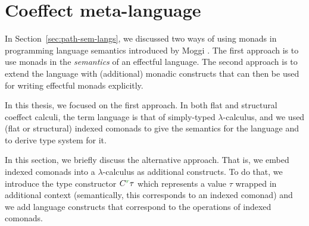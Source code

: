 %                                                                                             

\section{Coeffect meta-language}
\label{sec:unified-meta} 

In Section~\ref{sec:path-sem-langs}, we discussed two ways of using monads in programming
language semantics introduced by Moggi \cite{monad-notions}. The first approach is to use
monads in the \emph{semantics} of an effectful language. The second approach is to extend the
language with (additional) monadic constructs that can then be used for writing effectful
monads explicitly.

In this thesis, we focused on the first approach. In both flat and structural coeffect calculi,
the term language is that of simply-typed $\lambda$-calculus, and we used (flat or structural)
indexed comonads to give the semantics for the language and to derive type system for it.

In this section, we briefly discuss the alternative approach. That is, we embed indexed
comonads into a $\lambda$-calculus as additional constructs. To do that, we introduce the
type constructor $\ctyp{\cclrd{r}}{\tau}$ which represents a value $\tau$ wrapped in additional
context (semantically, this corresponds to an indexed comonad) and we add language constructs
that correspond to the operations of indexed comonads.

